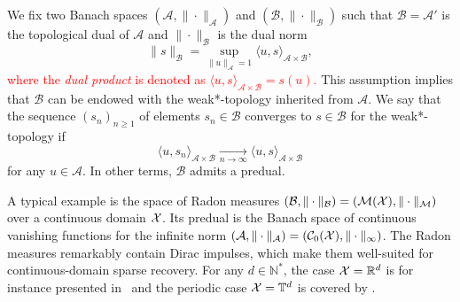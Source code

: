 \documentclass[12pt]{article}
\begin{document}
    We fix two Banach spaces $( \mathcal{A}, \| \cdot \|_{\mathcal{A}})$ and $( \mathcal{B}, \| \cdot \|_{\mathcal{B}})$ such that $\mathcal{B} = \mathcal{A}'$ is the topological dual of $\mathcal{A}$ and $\| \cdot \|_{\mathcal{B}}$ is the dual norm 
    \begin{equation*}
        \| s \|_{\mathcal{B}} = \sup_{\|u \|_{\mathcal{A}}=1} \langle u, s \rangle_{\mathcal{A}\times\mathcal{B}}, 
    \end{equation*}
    \textcolor{red}{where the \emph{dual product} is denoted as $\langle u, s \rangle_{\mathcal{A}\times\mathcal{B}} = s(u)$.}
    This assumption implies that $\mathcal{B}$ can be endowed with the weak*-topology inherited from $\mathcal{A}$. We say that the sequence $(s_n)_{n\geq 1}$ of elements $s_n \in \mathcal{B}$ converges to $s \in \mathcal{B}$ for the weak*-topology if 
    \begin{equation*}
        \langle u , s_n \rangle_{\mathcal{A}\times\mathcal{B}} \underset{n\rightarrow \infty}{\longrightarrow} \langle u, s \rangle_{\mathcal{A}\times\mathcal{B}} 
    \end{equation*}
    for any $u \in \mathcal{A}$.
    In other terms, $\mathcal{B}$ admits a predual\footnotemark.

    A typical example is the space of Radon measures $(\mathcal{B}, \|\cdot \|_{\mathcal{B}}) = ({\mathcal{M}}({\mathcal{X}}), \|\cdot \|_{\mathcal{M}})$ over a continuous domain $\mathcal{X}$. Its predual is the Banach space of continuous vanishing functions for the infinite norm $(\mathcal{A}, \|\cdot \|_{\mathcal{A}}) =({\mathcal{C}}_0({\mathcal{X}}), \| \cdot \|_{\infty})$. The Radon measures remarkably contain Dirac impulses, which make them well-suited for continuous-domain sparse recovery. For any $d\in\mathbb{N}^*$, the case $\mathcal{X}=\mathbb{R}^d$ is for instance presented in~\cite{unser2017splines,Unser2020} and the periodic case $\mathcal{X}=\mathbb{T}^d$ is covered by \cite{fageot2020tv}.
\end{document}
